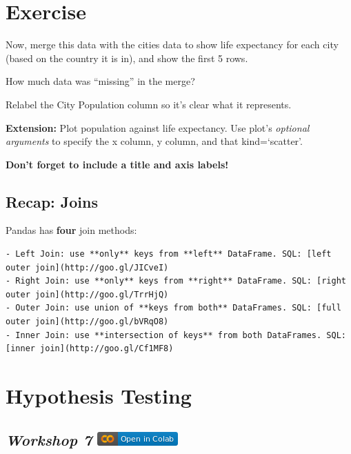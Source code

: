 \documentclass[
  letterpaper,
  DIV=11,
  numbers=noendperiod]{scrreprt}
\begin{document}

\hypertarget{exercise-21}{%
\chapter{Exercise}\label{exercise-21}}

Now, merge this data with the cities data to show life expectancy for
each city (based on the country it is in), and show the first 5 rows.

How much data was ``missing'' in the merge?

Relabel the City Population column so it's clear what it represents.

\textbf{Extension:} Plot population against life expectancy. Use plot's
\emph{optional arguments} to specify the x column, y column, and that
kind=`scatter'.

\textbf{Don't forget to include a title and axis labels!}

\hypertarget{recap-joins}{%
\section{Recap: Joins}\label{recap-joins}}

Pandas has \textbf{four} join methods:

\begin{verbatim}
- Left Join: use **only** keys from **left** DataFrame. SQL: [left outer join](http://goo.gl/JICveI)
- Right Join: use **only** keys from **right** DataFrame. SQL: [right outer join](http://goo.gl/TrrHjQ)
- Outer Join: use union of **keys from both** DataFrames. SQL: [full outer join](http://goo.gl/bVRqO8)
- Inner Join: use **intersection of keys** from both DataFrames. SQL: [inner join](http://goo.gl/Cf1MF8)
\end{verbatim}


\hypertarget{hypothesis-testing}{%
\chapter{Hypothesis Testing}\label{hypothesis-testing}}

\hypertarget{workshop-7-open-in-colab}{%
\section[\emph{Workshop 7} ]{\texorpdfstring{\emph{Workshop 7}
\href{https://colab.research.google.com/github/oballinger/QM2/blob/main/notebooks/W07.\%20Hypothesis\%20Testing.ipynb}{\protect\includegraphics{index_files/mediabag/colab-badge.png}}}{Workshop 7 Open In Colab}}\label{workshop-7-open-in-colab}}
\end{document}
